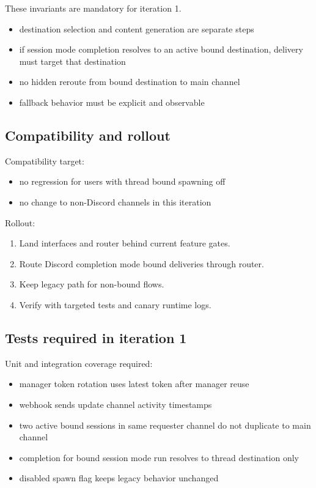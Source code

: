 These invariants are mandatory for iteration 1.

\begin{itemize}
  \item destination selection and content generation are separate steps
  \item if session mode completion resolves to an active bound destination, delivery must target that destination
  \item no hidden reroute from bound destination to main channel
  \item fallback behavior must be explicit and observable
\end{itemize}


\subsection{Compatibility and rollout}


Compatibility target:

\begin{itemize}
  \item no regression for users with thread bound spawning off
  \item no change to non-Discord channels in this iteration
\end{itemize}


Rollout:

\begin{enumerate}
  \item Land interfaces and router behind current feature gates.
  \item Route Discord completion mode bound deliveries through router.
  \item Keep legacy path for non-bound flows.
  \item Verify with targeted tests and canary runtime logs.
\end{enumerate}


\subsection{Tests required in iteration 1}


Unit and integration coverage required:

\begin{itemize}
  \item manager token rotation uses latest token after manager reuse
  \item webhook sends update channel activity timestamps
  \item two active bound sessions in same requester channel do not duplicate to main channel
  \item completion for bound session mode run resolves to thread destination only
  \item disabled spawn flag keeps legacy behavior unchanged
\end{itemize}


